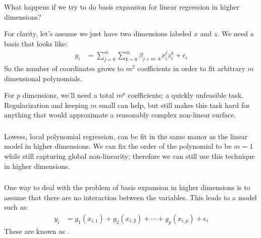 \documentclass[xetex,mathserif,serif,aspectratio=169]{beamer}
\begin{document}
\begin{frame}[fragile] \frametitle{} \oldB \small

\textbf{}

What happens if we try to do basis expansion for linear regression in
higher dimensions?

\pause For clarity, let's assume we just have two dimensions labeled $x$ and $z$.
We need a basis that looks like:
\begin{align*}
y_i &= \sum_{j=0}^m \sum_{k=0}^m \beta_{j + m \cdot k} x_i^j z_i^k + \epsilon_i
\end{align*}
So the number of coordinates grows to $m^2$ coefficients in order to
fit arbitrary $m$ dimensional polynomials.

\pause For $p$ dimensions, we'll need a total $m^p$ coefficients; a quickly
unfeasible task. Regularization and keeping $m$ small can help, but still
makes this task hard for anything that would approximate a reasonably complex
non-linear surface.

\end{frame}

\begin{frame}[fragile] \frametitle{} \oldB \small

\textbf{}

Lowess, local polynomial regression, can be fit in the same manor as the
linear model in higher dimensions. We can fix the order of the polynomial to
be $m=1$ while still capturing global non-linearity; therefore we can still
use this technique in higher dimensions.

\end{frame}

\begin{frame}[fragile] \frametitle{} \oldB \small

\textbf{}

One way to deal with the problem of basis expansion in higher dimensions
is to assume that there are no interaction between the variables. This
leads to a model such as:
\begin{align*}
y_i &= g_1(x_{i,1}) + g_2(x_{i,2}) + \cdots + g_p(x_{i,p})  + \epsilon_i
\end{align*}
These are known as .

\end{frame}
\end{document}
